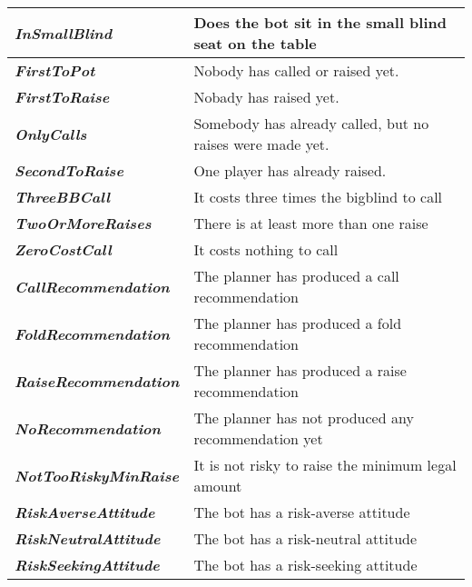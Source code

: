 \begin{tabular}{|l|l|}
    \textit{\textbf{InSmallBlind}}                & Does the bot sit in the small blind seat on the table           \\ \hline
    \textit{\textbf{FirstToPot}}                  & Nobody has called or raised yet.                                \\ \hline
    \textit{\textbf{FirstToRaise}}                & Nobady has raised yet.                                          \\ \hline
    \textit{\textbf{OnlyCalls}}                   & Somebody has already called, but no raises were made yet.       \\ \hline
    \textit{\textbf{SecondToRaise}}               & One player has already raised.                                  \\ \hline
    \textit{\textbf{ThreeBBCall}}                 & It costs three times the bigblind to call                       \\ \hline
    \textit{\textbf{TwoOrMoreRaises}}             & There is at least more than one raise                           \\ \hline
    \textit{\textbf{ZeroCostCall}}                & It costs nothing to call                                        \\ \hline
    \textit{\textbf{CallRecommendation}}          & The planner has produced a call recommendation                  \\ \hline
    \textit{\textbf{FoldRecommendation}}          & The planner has produced a fold recommendation                  \\ \hline
    \textit{\textbf{RaiseRecommendation}}         & The planner has produced a raise recommendation                 \\ \hline
    \textit{\textbf{NoRecommendation}}            & The planner has not produced any recommendation yet             \\ \hline
    \textit{\textbf{NotTooRiskyMinRaise}}         & It is not risky to raise the minimum legal amount               \\ \hline
    \textit{\textbf{RiskAverseAttitude}}          & The bot has a risk-averse attitude                              \\ \hline
    \textit{\textbf{RiskNeutralAttitude}}         & The bot has a risk-neutral attitude                             \\ \hline
    \textit{\textbf{RiskSeekingAttitude}}         & The bot has a risk-seeking attitude                             \\ \hline

\end{tabular}
